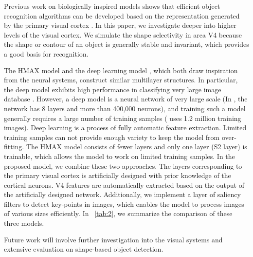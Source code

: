 \documentclass[twocolumn]{article}
\begin{document}
Previous work on biologically inspired models shows that efficient object recognition algorithms can be developed 
based on the representation generated by the primary visual cortex \cite{wei2014,wei2014b,zhao2013}.
In this paper, we investigate deeper into higher levels of the visual cortex.
We simulate the shape selectivity in area V4 because the shape or contour of an object is generally stable and invariant, which provides a good basis for recognition.

The HMAX model \cite{cadieu2007} and the deep learning model \cite{bengio2009}, which both draw inspiration from the neural systems, 
construct similar multilayer structures.
In particular, the deep model exhibits high performance in classifying very large image database \cite{krizhevsky2012}.
However, a deep model is a neural network of very large scale (In \cite{krizhevsky2012}, the network has 8 layers and more than 400,000 neurons),
and training such a model generally requires a large number of training samples (\cite{krizhevsky2012} uses 1.2 million training images).
Deep learning is a process of fully automatic feature extraction.
Limited training samples can not provide enough variety to keep the model from over-fitting.
The HMAX model consists of fewer layers and only one layer (S2 layer) is trainable, which allows the model to work on limited training samples.
In the proposed model, we combine these two approaches.
The layers corresponding to the primary visual cortex is artificially designed with prior knowledge of the cortical neurons.
V4 features are automatically extracted based on the output of the artificially designed network.
Additionally, we implement a layer of saliency filters to detect key-points in images,
which enables the model to process images of various sizes efficiently. 
In \tablename~\ref{tab:2}, we summarize the comparison of these three models.

Future work will involve further investigation into the visual systems and extensive evaluation on shape-based object detection.



\end{document}
